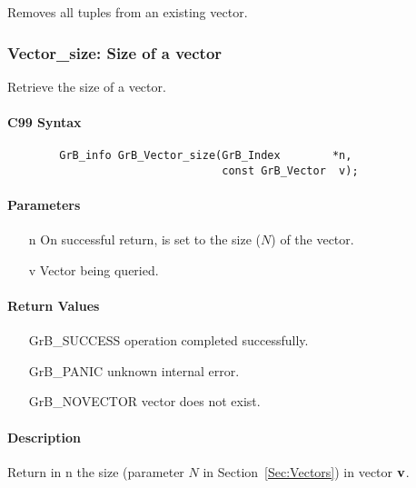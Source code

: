 Removes all tuples from an existing vector.

\subsubsection{{\sf Vector\_size}: Size of a vector}

Retrieve the size of a vector.

\paragraph{C99 Syntax}

\begin{verbatim}
        GrB_info GrB_Vector_size(GrB_Index        *n,
                                 const GrB_Vector  v);
\end{verbatim}

\paragraph{Parameters}

\begin{itemize}[leftmargin=1.1in]
    \item[{\sf n}] On successful return, is set to the size ($N$) of the vector.
    \item[{\sf v}] Vector being queried.
\end{itemize}

\paragraph{Return Values}

\begin{itemize}[leftmargin=2.1in]
\item[{\sf GrB\_SUCCESS}]   operation completed successfully.
\item[{\sf GrB\_PANIC}]     unknown internal error.
\item[{\sf GrB\_NOVECTOR}]  vector does not exist.
\end{itemize}

\paragraph{Description}

Return in {\sf n} the size (parameter $N$ in Section~\ref{Sec:Vectors}) in vector ${\bf v}$.

